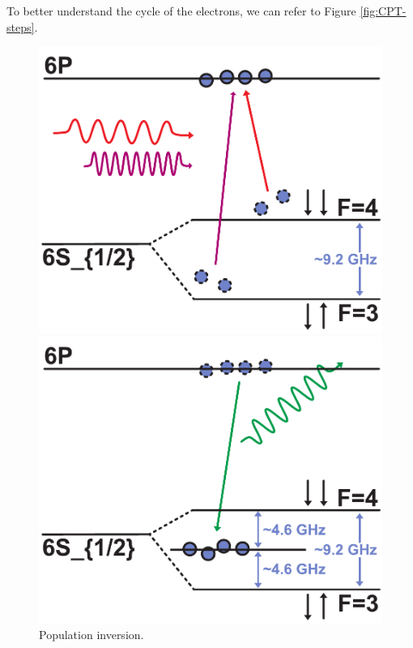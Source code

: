 To better understand the cycle of the electrons, we can refer to Figure \ref{fig:CPT-steps}.

\begin{figure}[H]
    \centering

    \begin{minipage}[t]{0.3\linewidth}
        \centering
        \includegraphics[width=\linewidth]{pdf/CPT/pumping.pdf}
        \caption{Population inversion.}
        \label{fig:CPT-pumping}
    \end{minipage}
    \hfill
    \begin{minipage}[t]{0.3\linewidth}
        \centering
        \includegraphics[width=\linewidth]{pdf/CPT/decay.pdf}

\end{minipage}
\end{figure}
